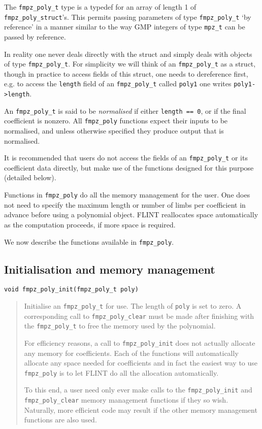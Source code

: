 \documentclass[a4paper,10pt]{article}
\newcommand{\code}{\lstinline}
\begin{document}
The \code{fmpz_poly_t} type is a typedef for an array of length 1 of \code{fmpz_poly_struct}'s. This permits passing parameters  of type \code{fmpz_poly_t} `by reference' in a manner similar to the way GMP integers of type \code{mpz_t} can be passed by reference. 

In reality one never deals directly with the struct and simply deals with objects of type \code{fmpz_poly_t}. For simplicity we will think of an \code{fmpz_poly_t} as a struct, though in practice to access fields of this struct, one needs to dereference first, e.g. to access the \code{length} field of an \code{fmpz_poly_t} called \code{poly1} one writes \code{poly1->length}. 

An \code{fmpz_poly_t} is said to be \emph{normalised} if either \code{length == 0}, or if the final coefficient is nonzero. All \code{fmpz_poly} functions expect their inputs to be normalised, and unless otherwise specified they produce output that is normalised. 

It is recommended that users do not access the fields of an \code{fmpz_poly_t} or its coefficient data directly, but make use of the functions designed for this purpose (detailed below).

Functions in \code{fmpz_poly} do all the memory management for the user. One does not need to specify the maximum length or number of limbs per coefficient in advance before using a polynomial object. FLINT reallocates space automatically as the computation proceeds, if more space is required. 

We now describe the functions available in \code{fmpz_poly}.

\subsection{Initialisation and memory management}

\begin{lstlisting}
void fmpz_poly_init(fmpz_poly_t poly)
\end{lstlisting}
\begin{quote}
Initialise an \code{fmpz_poly_t} for use. The length of \code{poly} is set to zero. A corresponding call to \code{fmpz_poly_clear} must be made after finishing with the \code{fmpz_poly_t} to free the memory used by the polynomial.

For efficiency reasons, a call to \code{fmpz_poly_init} does not actually allocate any memory for coefficients. Each of the functions will automatically allocate any space needed for coefficients and in fact the easiest way to use \code{fmpz_poly} is to let FLINT do all the allocation automatically. 

To this end, a user need only ever make calls to the \code{fmpz_poly_init} and \code{fmpz_poly_clear} memory management functions if they so wish. Naturally, more efficient code may result if the other memory management functions are also used.
\end{quote}
\end{document}
